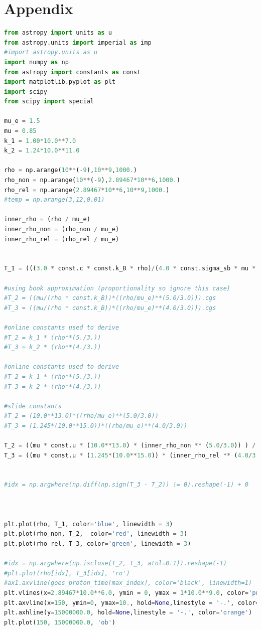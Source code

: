 \documentclass[onecolumn]{aastex6}
\begin{document}
\clearpage
\section{Appendix}

\begin{lstlisting}[language=Python, caption=Python source code.]
from astropy import units as u
from astropy.units import imperial as imp
#import astropy.units as u
import numpy as np
from astropy import constants as const
import matplotlib.pyplot as plt
import scipy
from scipy import special

mu_e = 1.5
mu = 0.85
k_1 = 1.00*10.0**7.0
k_2 = 1.24*10.0**11.0

rho = np.arange(10**(-9),10**9,1000.)
rho_non = np.arange(10**(-9),2.89467*10**6,1000.)
rho_rel = np.arange(2.89467*10**6,10**9,1000.)
#temp = np.arange(3,12,0.01)

inner_rho = (rho / mu_e)
inner_rho_non = (rho_non / mu_e)
inner_rho_rel = (rho_rel / mu_e)


T_1 = (((3.0 * const.c * const.k_B * rho)/(4.0 * const.sigma_sb * mu * const.u))**(1./3.)).cgs

#using book approximation (proportionality so ignore this case)
#T_2 = ((mu/(rho * const.k_B))*((rho/mu_e)**(5.0/3.0))).cgs
#T_3 = ((mu/(rho * const.k_B))*((rho/mu_e)**(4.0/3.0))).cgs

#online constants used to derive
#T_2 = k_1 * (rho**(5./3.))
#T_3 = k_2 * (rho**(4./3.))

#online constants used to derive
#T_2 = k_1 * (rho**(5./3.))
#T_3 = k_2 * (rho**(4./3.))

#slide constants
#T_2 = (10.0**13.0)*((rho/mu_e)**(5.0/3.0))
#T_3 = (1.245*(10.0**15.0))*((rho/mu_e)**(4.0/3.0))

T_2 = ((mu * const.u * (10.0**13.0) * (inner_rho_non ** (5.0/3.0)) ) / (rho_non * const.k_B)).cgs
T_3 = ((mu * const.u * (1.245*(10.0**15.0)) * (inner_rho_rel ** (4.0/3.0)) ) / (rho_rel * const.k_B)).cgs


#idx = np.argwhere(np.diff(np.sign(T_3 - T_2)) != 0).reshape(-1) + 0



plt.plot(rho, T_1, color='blue', linewidth = 3)
plt.plot(rho_non, T_2,  color='red', linewidth = 3)
plt.plot(rho_rel, T_3, color='green', linewidth = 3)

#idx = np.argwhere(np.isclose(T_2, T_3, atol=0.1)).reshape(-1)
#plt.plot(rho[idx], T_3[idx], 'ro')
#ax1.axvline(goes_proton_time[max_index], color='black', linewidth=1)
plt.vlines(x=2.89467*10.0**6.0, ymin = 0, ymax = 1*10.0**9.0, color='purple', linewidth = 3)
plt.axvline(x=150, ymin=0, ymax=10., hold=None,linestyle = '-.', color='orange')
plt.axhline(y=15000000.0, hold=None,linestyle = '-.', color='orange')
plt.plot(150, 15000000.0, 'ob')



\end{lstlisting}
\end{document}
